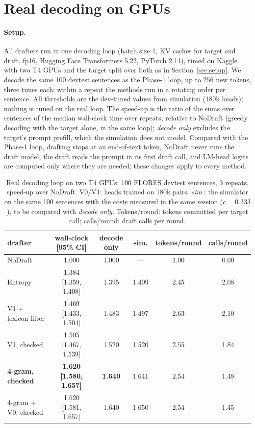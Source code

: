 \section{Real decoding on GPUs}
\label{sec:real}

\paragraph{Setup.} All drafters run in one decoding loop (batch size 1, KV caches for target and draft,
fp16, Hugging Face Transformers 5.22, PyTorch 2.11), timed on Kaggle with two T4 GPUs and the target
split over both as in Section~\ref{sec:setup}. We decode the same 100 devtest sentences as the Phase-1
loop, up to 256 new tokens, three times each; within a repeat the methods run in a rotating order per
sentence. All thresholds are the dev-tuned values from simulation (180k heads); nothing is tuned on the
real loop. The speed-up is the ratio of the sums over sentences of the median wall-clock time over
repeats, relative to NoDraft (greedy decoding with the target alone, in the same loop); \emph{decode
only} excludes the target's prompt prefill, which the simulation does not model. Compared with the
Phase-1 loop, drafting stops at an end-of-text token, NoDraft never runs the draft model, the draft
reads the prompt in its first draft call, and LM-head logits are computed only where they are needed;
these changes apply to every method.

\begin{table}[t]
\centering
\small
\setlength{\tabcolsep}{4pt}
\begin{tabular}{lccccc}
\toprule
drafter & wall-clock [95\% CI] & decode only & sim. & tokens/round & calls/round \\
\midrule
NoDraft & 1.000 & 1.000 & --- & 1.00 & 0.00 \\
Entropy & 1.384 [1.359, 1.408] & 1.395 & 1.409 & 2.45 & 2.08 \\
V1 + lexicon filter & 1.469 [1.433, 1.504] & 1.483 & 1.497 & 2.63 & 2.10 \\
V1, checked & 1.505 [1.467, 1.539] & 1.520 & 1.520 & 2.55 & 1.84 \\
\textbf{4-gram, checked} & \textbf{1.620 [1.580, 1.657]} & \textbf{1.640} & 1.641 & 2.54 & 1.48 \\
4-gram + V0, checked & 1.620 [1.581, 1.657] & 1.640 & 1.650 & 2.54 & 1.45 \\
\bottomrule
\end{tabular}
\caption{Real decoding loop on two T4 GPUs: 100 FLORES devtest sentences, 3 repeats, speed-up over
NoDraft. V0/V1: heads trained on 180k pairs. \emph{sim.}: the simulator on the same 100 sentences with
the costs measured in the same session ($c=0.333$), to be compared with \emph{decode only}.
Tokens/round: tokens committed per target call; calls/round: draft calls per round.}
\label{tab:real}
\end{table}

